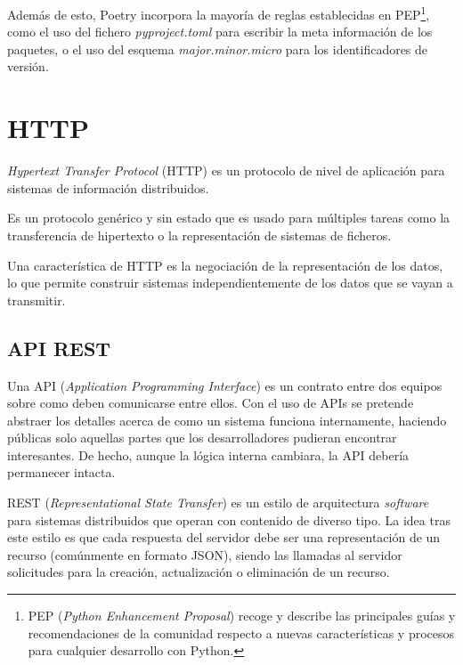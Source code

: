 Además de esto, Poetry incorpora la mayoría de reglas establecidas en PEP\footnote{PEP (\emph{Python Enhancement Proposal}) recoge y describe las principales guías y recomendaciones de la comunidad respecto a nuevas características y procesos para cualquier desarrollo con Python.}, como el uso del fichero \emph{pyproject.toml} para escribir la meta información de los paquetes, o el uso del esquema \emph{major.minor.micro} para los identificadores de versión. \emph{\parencite{Reference6}}


\section{HTTP}

\emph{Hypertext Transfer Protocol} (HTTP) es un protocolo de nivel de aplicación para sistemas de información distribuidos.

Es un protocolo genérico y sin estado que es usado para múltiples tareas como la transferencia de hipertexto o la representación de sistemas de ficheros.

Una característica de HTTP es la negociación de la representación de los datos, lo que permite construir sistemas independientemente de los datos que se vayan a transmitir. \emph{\parencite{Reference26}}

\subsection{API REST}

Una API (\emph{Application Programming Interface}) es un contrato entre dos equipos sobre como deben comunicarse entre ellos. Con el uso de APIs se pretende abstraer los detalles acerca de como un sistema funciona internamente, haciendo públicas solo aquellas partes que los desarrolladores pudieran encontrar interesantes. De hecho, aunque la lógica interna cambiara, la API debería permanecer intacta. \emph{\parencite{Reference27}}

REST (\emph{Representational State Transfer}) es un estilo de arquitectura \emph{software} para sistemas distribuidos que operan con contenido de diverso tipo. La idea tras este estilo es que cada respuesta del servidor debe ser una representación de un recurso (comúnmente en formato JSON), siendo las llamadas al servidor solicitudes para la creación, actualización o eliminación de un recurso. \emph{\parencite{Reference28}}

